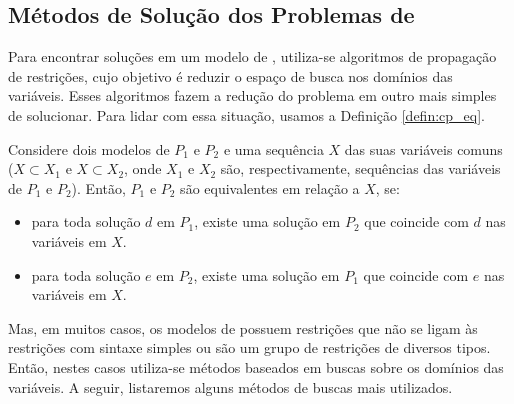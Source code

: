 \subsection{Métodos de Solução dos Problemas de \PR{}}
\label{subsec:sol_cp}
Para encontrar soluções em um modelo de \pr{}, utiliza-se algoritmos
de propagação de restrições, cujo objetivo é reduzir o espaço de busca
nos domínios das variáveis. Esses algoritmos fazem a redução do
problema em outro mais simples de solucionar. Para lidar com essa
situação, usamos a Definição \ref{defin:cp_eq}.
\begin{defin}
\label{defin:cp_eq}
Considere dois modelos de \pr{} $P_{1}$ e $P_{2}$ e uma sequência $X$
das suas variáveis comuns ($X \subset X_{1}$ e $X \subset X_{2}$, onde
$X_{1}$ e $X_{2}$ são, respectivamente, sequências das variáveis de
$P_{1}$ e $P_{2}$). Então, $P_{1}$ e $P_{2}$ são equivalentes em
relação a $X$, se:
\begin{itemize}
  \item{para toda solução $d$ em $P_{1}$, existe uma solução em
  $P_{2}$ que coincide com $d$ nas variáveis em $X$.}

  \item{para toda solução $e$ em $P_{2}$, existe uma solução em
  $P_{1}$ que coincide com $e$ nas variáveis em $X$.}
\end{itemize}
\end{defin}

Mas, em muitos casos, os modelos de \pr{} possuem restrições que não
se ligam às restrições com sintaxe simples ou são um grupo de
restrições de diversos tipos. Então, nestes casos utiliza-se métodos
baseados em buscas sobre os domínios das variáveis. A seguir,
listaremos alguns métodos de buscas mais utilizados.

